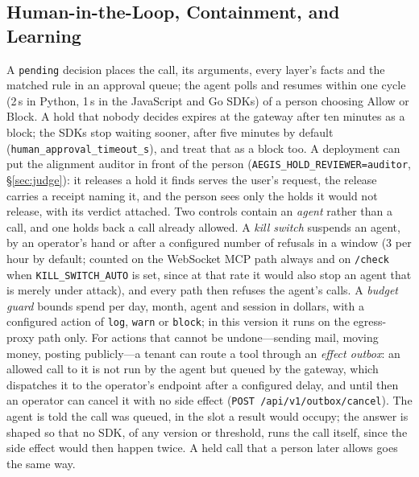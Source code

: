 \subsection{Human-in-the-Loop, Containment, and Learning}
\label{sec:hitl}

A \texttt{pending} decision places the call, its arguments, every layer's
facts and the matched rule in an approval queue; the agent polls and
resumes within one cycle (2\,s in Python, 1\,s in the JavaScript and Go SDKs) of a person choosing Allow or Block. A hold that nobody decides expires at the gateway after ten minutes as a block; the SDKs stop waiting sooner, after five minutes by default (\texttt{human\_approval\_timeout\_s}), and treat that as a block too. A deployment can put the alignment auditor in front of the person (\texttt{AEGIS\_HOLD\_REVIEWER=auditor}, \S\ref{sec:judge}): it releases a hold it finds serves the user's request, the release carries a receipt naming it, and the person sees only the holds it would not release, with its verdict attached. Two controls contain an \emph{agent} rather than a call, and one holds back a call already allowed. A \emph{kill switch} suspends an agent, by an operator's hand or after a configured number of refusals in a window (3 per hour by default; counted on the WebSocket MCP path always and on \texttt{/check} when \texttt{KILL\_SWITCH\_AUTO} is set, since at that rate it would also stop an agent that is merely under attack), and every path then refuses the agent's calls. A \emph{budget guard} bounds spend per day, month, agent and session in dollars, with a configured action of \texttt{log}, \texttt{warn} or \texttt{block}; in this version it runs on the egress-proxy path only. For actions that cannot be undone---sending mail, moving money, posting publicly---a tenant can route a tool through an \emph{effect outbox}: an allowed call to it is not run by the agent but queued by the gateway, which dispatches it to the operator's endpoint after a configured delay, and until then an operator can cancel it with no side effect (\texttt{POST /api/v1/outbox/cancel}). The agent is told the call was queued, in the slot a result would occupy; the answer is shaped so that no SDK, of any version or threshold, runs the call itself, since the side effect would then happen twice. A held call that a person later allows goes the same way.

